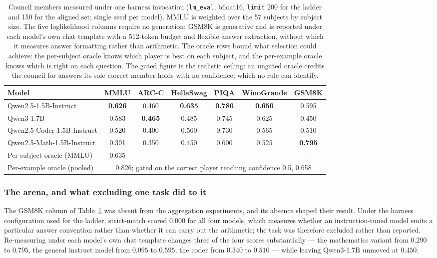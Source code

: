 \begin{table}[t]
\centering
\caption{Council members measured under one harness invocation
(\texttt{lm\_eval}, bfloat16, \texttt{limit} 200 for the ladder and 150 for the
aligned set; single seed per model). MMLU is weighted over the 57 subjects by
subject size. The five loglikelihood columns require no generation; GSM8K is
generative and is reported under each model's own chat template with a 512-token
budget and flexible answer extraction, without which it measures answer
formatting rather than arithmetic. The oracle rows bound what selection could
achieve: the per-subject oracle knows which player is best on each subject, and
the per-example oracle knows which is right on each question. The gated figure
is the realistic ceiling: an ungated oracle credits the council for answers its
sole correct member holds with no confidence, which no rule can identify.}
\label{tab:ladder}
\begin{tabular}{lcccccc}
\toprule
Model & MMLU & ARC-C & HellaSwag & PIQA & WinoGrande & GSM8K \\
\midrule
Qwen2.5-1.5B-Instruct       & \textbf{0.626} & 0.460 & \textbf{0.635} & \textbf{0.780} & \textbf{0.650} & 0.595 \\
Qwen3-1.7B                  & 0.583 & \textbf{0.465} & 0.485 & 0.745 & 0.625 & 0.450 \\
Qwen2.5-Coder-1.5B-Instruct & 0.520 & 0.400 & 0.560 & 0.730 & 0.565 & 0.510 \\
Qwen2.5-Math-1.5B-Instruct  & 0.391 & 0.350 & 0.450 & 0.600 & 0.525 & \textbf{0.795} \\
\midrule
Per-subject oracle (MMLU)   & 0.635 & --- & --- & --- & --- & --- \\
Per-example oracle (pooled) & \multicolumn{6}{c}{0.826; gated on the correct player reaching confidence 0.5, 0.658} \\
\bottomrule
\end{tabular}
\end{table}

\subsubsection{The arena, and what excluding one task did to it}

The GSM8K column of Table~\ref{tab:ladder} was absent from the aggregation
experiments, and its absence shaped their result. Under the harness configuration
used for the ladder, strict-match scored $0.000$ for all four models, which
measures whether an instruction-tuned model emits a particular answer convention
rather than whether it can carry out the arithmetic; the task was therefore
excluded rather than reported. Re-measuring under each model's own chat template
changes three of the four scores substantially --- the mathematics variant from
$0.290$ to $0.795$, the general instruct model from $0.095$ to $0.595$, the coder
from $0.340$ to $0.510$ --- while leaving Qwen3-1.7B unmoved at $0.450$.

